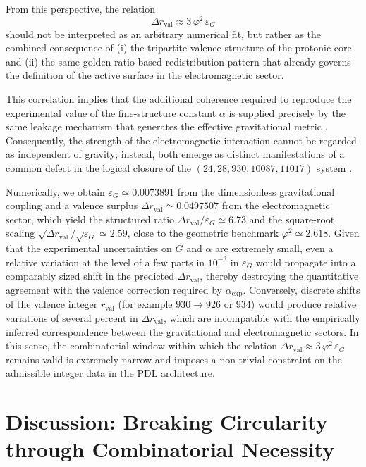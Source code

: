 \documentclass[11pt,a4paper]{article}
\begin{document}
From this perspective, the relation
\[
\Delta r_{\text{val}} \approx 3\,\varphi^2\,\varepsilon_G
\]
should not be interpreted as an arbitrary numerical fit, but rather as the combined consequence of (i) the tripartite valence structure of the protonic core and (ii) the same golden-ratio-based redistribution pattern that already governs the definition of the active surface in the electromagnetic sector.

This correlation implies that the additional coherence required to reproduce the experimental value of the fine-structure constant $\alpha$ is supplied precisely by the same leakage mechanism that generates the effective gravitational metric \cite{Exponent_18_PDL_2026}. Consequently, the strength of the electromagnetic interaction cannot be regarded as independent of gravity; instead, both emerge as distinct manifestations of a common defect in the logical closure of the $(24, 28, 930, 10087, 11017)$ system \cite{PDL_Global_Mapping_2026}.

Numerically, we obtain \(\varepsilon_G \simeq 0.0073891\) from the
dimensionless gravitational coupling and a valence surplus
\(\Delta r_{\text{val}} \simeq 0.0497507\) from the electromagnetic sector,
which yield the structured ratio \(\Delta r_{\text{val}}/\varepsilon_G \simeq
6.73\) and the square-root scaling
\(\sqrt{\Delta r_{\text{val}}}/\sqrt{\varepsilon_G} \simeq 2.59\), close to
the geometric benchmark \(\varphi^2 \simeq 2.618\).
Given that the experimental uncertainties on \(G\) and \(\alpha\) are extremely
small, even a relative variation at the level of a few parts in \(10^{-3}\) in
\(\varepsilon_G\) would propagate into a comparably sized shift in the
predicted \(\Delta r_{\text{val}}\), thereby destroying the quantitative
agreement with the valence correction required by
\(\alpha_{\text{exp}}\).
Conversely, discrete shifts of the valence integer \(r_{\text{val}}\) (for
example \(930 \rightarrow 926\) or \(934\)) would produce relative variations
of several percent in \(\Delta r_{\text{val}}\), which are incompatible with
the empirically inferred correspondence between the gravitational and
electromagnetic sectors.
In this sense, the combinatorial window within which the relation
\(\Delta r_{\text{val}} \approx 3\,\varphi^2\,\varepsilon_G\) remains valid is
extremely narrow and imposes a non-trivial constraint on the admissible
integer data in the PDL architecture. \cite{Alpha_PDL_2026,Combinatorial_Proton_v2_2026}

\section{Discussion: Breaking Circularity through Combinatorial Necessity}
\end{document}

